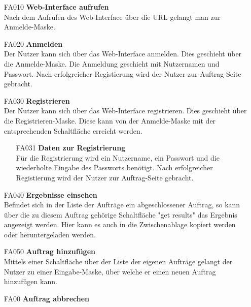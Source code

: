 \begin{itemize}
     \item[FA010] \textbf{Web-Interface aufrufen} \\
        Nach dem Aufrufen des Web-Interface über die URL gelangt man zur Anmelde-Maske.

     \item[FA020] \textbf{Anmelden} \\
        Der Nutzer kann sich über das Web-Interface anmelden. Dies geschieht über die Anmelde-Maske. Die Anmeldung geschieht mit Nutzernamen und Passwort. Nach erfolgreicher Registierung wird der Nutzer zur Auftrag-Seite gebracht.
        
     \item[FA030] \textbf{Registrieren} \\
        Der Nutzer kann sich über das Web-Interface registrieren. Dies geschieht über die Registrieren-Maske. Diese kann von der Anmelde-Maske mit der entsprechenden Schaltfläche erreicht werden. 
        
    \begin{itemize}
        \item[FA031] \textbf{Daten zur Registrierung} \\
        Für die Registrierung wird ein Nutzername, ein Passwort und die wiederholte Eingabe des Passworts benötigt. Nach erfolgreicher Registierung wird der Nutzer zur Auftrag-Seite gebracht.
    \end{itemize}
        

        
    \item[FA040] \textbf{Ergebnisse einsehen} \\
        Befindet sich in der Liste der Aufträge ein abgeschlossener Auftrag, so kann über die zu diesem Auftrag gehörige Schaltfläche "get results" das Ergebnis angezeigt werden. Hier kann es auch in die Zwischenablage kopiert werden oder heruntergeladen werden.
        
   \item[FA050] \textbf{Auftrag hinzufügen} \\ 
        Mittels einer Schaltfläche über der Liste der eigenen Aufträge gelangt der Nutzer zu einer Eingabe-Maske, über welche er einen neuen Auftrag hinzufügen kann. 
   \item[FA00] \textbf{Auftrag abbrechen} \\
   

\end{itemize}
